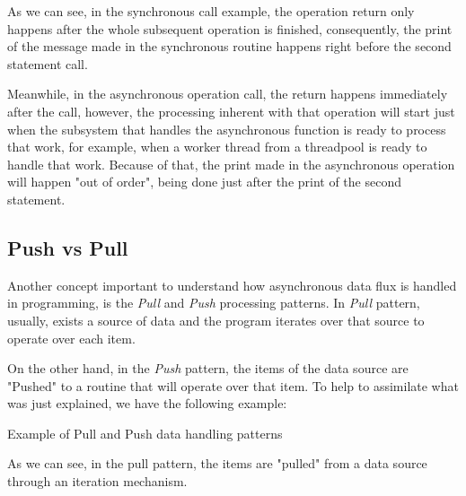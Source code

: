 	As we can see, in the synchronous call example, the operation return only happens after the whole subsequent operation is finished, consequently, the print of the message made in the synchronous routine happens right before the second statement call. 

	Meanwhile, in the asynchronous operation call, the return happens immediately after the call, however, the processing inherent with that operation will start just when the subsystem that handles the asynchronous function is ready to process that work, for example, when a worker thread from a threadpool is ready to handle that work.
	Because of that, the print made in the asynchronous operation will happen "out of order", being done just after the print of the second statement.




	\subsection{Push vs Pull} 
	
	Another concept important to understand how asynchronous data flux is handled in programming, is the \textit{Pull} and \textit{Push} processing patterns.
	In \textit{Pull} pattern, usually, exists a source of data and the program iterates over that source to operate over each item. 
	
	On the other hand, in the \textit{Push} pattern, the items of the data source are "Pushed" to a routine that will operate over that item.
	To help to assimilate what was just explained, we have the following example:

	\begin{figure2}
		\centering
		\begin{subfigure}[h]{0.4\textwidth}
			\centering
			\caption{}
		 \end{subfigure}	
	\qquad\qquad
		 \begin{subfigure}[h]{0.4\textwidth}
			\centering
			\caption{}
		\end{subfigure}		
	  \caption{Example of Pull and Push data handling patterns}
	  \label{fig:exmplo2}
	\end{figure2}
	
	As we can see, in the pull pattern, the items are "pulled" from a data source through an iteration mechanism. 
	
